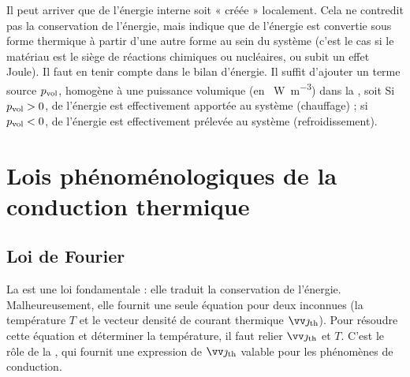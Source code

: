 \documentclass[12pt,fancy]{cours}
\begin{document}
Il peut arriver que de l’énergie interne soit « créée » localement. Cela ne contredit pas la conservation de l’énergie, mais indique que de l’énergie est convertie sous forme thermique à partir d’une autre forme au sein du système (c’est le cas si le matériau est le siège de réactions chimiques ou nucléaires, ou subit un effet Joule). Il faut en tenir compte dans le bilan d’énergie. Il suffit d’ajouter un terme source $p_{\rm{vol}}$, homogène à une puissance volumique  (en \SI{}{W.m^{-3}}) dans la , soit
Si $p_{\rm{vol}}>0$, de l’énergie est effectivement apportée au système (chauffage) ; si $p_{\rm{vol}}<0$, de l'énergie est effectivement prélevée au système (refroidissement).

\section{Lois phénoménologiques de la conduction thermique}

\subsection{Loi de Fourier}
La  est une loi fondamentale : elle traduit la conservation de l’énergie. Malheureusement, elle fournit une seule équation pour deux inconnues (la température $T$ et le vecteur densité de courant thermique $\Vec{\jth}$). Pour résoudre cette équation et déterminer la température, il faut relier $\Vec{\jth}$ et $T$. C'est le rôle de la , qui fournit une expression de $\Vec{\jth}$ valable pour les phénomènes de conduction.
\end{document}
